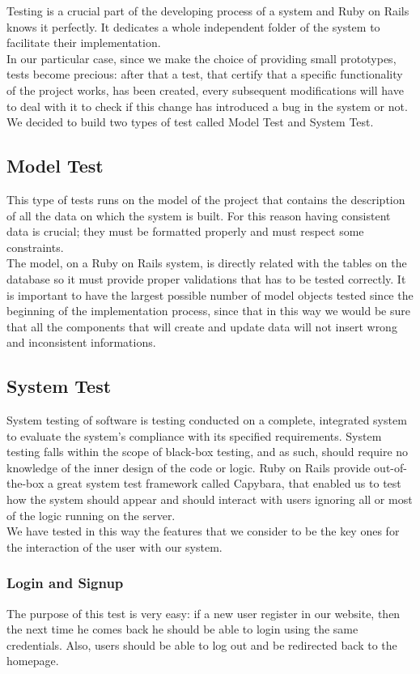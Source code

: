 Testing is a crucial part of the developing process of a system and Ruby on Rails knows it perfectly. It dedicates a whole independent folder of the system to facilitate their implementation. \\
In our particular case, since we make the choice of providing small prototypes, tests become precious: after that a test, that certify that a specific functionality of the project works, has been created, every subsequent modifications will have to deal with it to check if this change has introduced a bug in the system or not. \\
We decided to build two types of test called Model Test and System Test.

\subsection{Model Test}
This type of tests runs on the model of the project that contains the description of all the data on which the system is built. For this reason having consistent data is crucial; they must be formatted properly and must respect some constraints. \\
The model, on a Ruby on Rails system, is directly related with the tables on the database so it must provide proper validations that has to be tested correctly. It is important to have the largest possible number of model objects tested since the beginning of the implementation process, since that in this way we would be sure that all the components that will create and update data will not insert wrong and inconsistent informations. 

\subsection{System Test}
System testing of software is testing conducted on a complete, integrated system to evaluate the system's compliance with its specified requirements. System testing falls within the scope of black-box testing, and as such, should require no knowledge of the inner design of the code or logic. Ruby on Rails provide out-of-the-box a great system test framework called Capybara, that enabled us to test how the system should appear and should interact with users ignoring all or most of the logic running on the server. \\
We have tested in this way the features that we consider to be the key ones for the interaction of the user with our system.

\subsubsection*{Login and Signup}
The purpose of this test is very easy: if a new user register in our website, then the next time he comes back he should be able to login using the same credentials. Also, users should be able to log out and be redirected back to the homepage.

